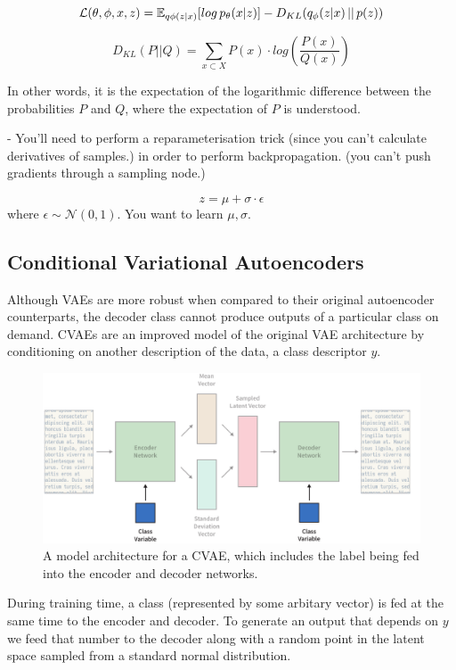 \documentclass[12pt,twoside]{report}
\begin{document}
  $$\mathcal{L}(\theta, \phi, x, z) = \mathbb{E}_{q \phi (z|x)}[log \thinspace p_{\theta}(x|z)] - D_{KL}(q_{\phi}(z|x)\thinspace||\thinspace p(z)) $$

$$
D_{KL}(P ||Q) = \sum_{x \subset X} P(x) \cdot log (\frac{P(x)}{Q(x)})
$$

In other words, it is the expectation of the logarithmic difference between the probabilities $P$ and $Q$, where the expectation of $P$ is understood.


- You'll need to perform a reparameterisation trick (since you can't calculate derivatives of samples.) in order to perform backpropagation. (you can't push gradients through a sampling node.)
  
$$z = \mu + \sigma \cdot \epsilon $$ where $\epsilon \sim \mathcal{N}(0,1)$. You want to learn $\mu, \sigma$.



\subsection{Conditional Variational Autoencoders}

Although VAEs are more robust when compared to their original autoencoder counterparts, the decoder class cannot produce outputs of a particular class on demand. CVAEs are an improved model of the original VAE architecture by conditioning on another description of the data, a class descriptor $y$. 

\begin{figure}[!ht]
      
	\centering
	\includegraphics[width=150mm]{diagrams/conditional_variational_autoencoders.pdf}
	\caption{A model architecture for a CVAE, which includes the label being fed into the encoder and decoder networks. \label{cvae_diagram}}
  \end{figure}

During training time, a class (represented by some arbitary vector) is fed at the same time to the encoder and decoder. To generate an output that depends on $y$ we feed that number to the decoder along with a random point in the latent space sampled from a standard normal distribution.
\end{document}
